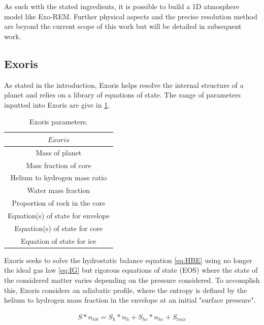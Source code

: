 As such with the stated ingredients, it is possible to build a 1D atmosphere model like Exo-REM. Further physical aspects \parencite{charnay_self-consistent_2018} and the precise resolution method are beyond the current scope of this work but will be detailed in subsequent work. 

\subsection{Exoris}

As stated in the introduction, Exoris helps resolve the internal structure of a planet and relies on a library of equations of state. The range of parameters inputted into Exoris are give in \cref{tab:Exrs}.\par

\begin{table}[htb]%
\centering
\caption{Exoris parameters.}
	\label{tab:Exrs}
	\begin{tabular}{c}
		\toprule
		{$Exoris$}  \\
		\midrule
        \midrule
        {Mass of planet} \\
        \midrule
		{Mass fraction of core}   \\
        \midrule
		{Helium to hydrogen mass ratio}   \\
        \midrule
		{Water mass fraction}   \\
        \midrule
		{Proportion of rock in the core}   \\
        \midrule
        {Equation(s) of state for envelope}   \\
        \midrule
        {Equation(s) of state for core}   \\
        \midrule
        {Equation of state for ice}   \\
        \bottomrule
	\end{tabular}
\end{table}

Exoris seeks to solve the hydrostatic balance equation \cref{eq:HBE} using no longer the ideal gas law \cref{eq:IG} but rigorous equations of state (EOS) where the state of the considered matter varies depending on the pressure considered. To accomplish this, Exoris considers an adiabatic profile, where the entropy is defined by the helium to hydrogen mass fraction in the envelope at an initial "surface pressure".

\begin{align}
    S*n_{tot} = S_{h}*n_{h} + S_{he}*n_{he} + S_{mix}\label{eq:S1}
\end{align}

